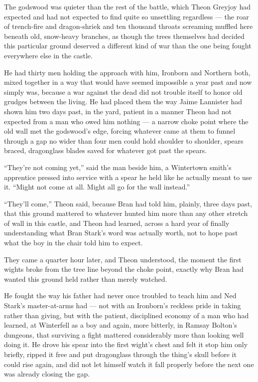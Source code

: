 The godswood was quieter than the rest of the battle, which Theon Greyjoy had expected and had not expected to find quite so unsettling regardless — the roar of trench-fire and dragon-shriek and ten thousand throats screaming muffled here beneath old, snow-heavy branches, as though the trees themselves had decided this particular ground deserved a different kind of war than the one being fought everywhere else in the castle.

He had thirty men holding the approach with him, Ironborn and Northern both, mixed together in a way that would have seemed impossible a year past and now simply was, because a war against the dead did not trouble itself to honor old grudges between the living. He had placed them the way Jaime Lannister had shown him two days past, in the yard, patient in a manner Theon had not expected from a man who owed him nothing — a narrow choke point where the old wall met the godswood’s edge, forcing whatever came at them to funnel through a gap no wider than four men could hold shoulder to shoulder, spears braced, dragonglass blades saved for whatever got past the spears.

“They’re not coming yet,” said the man beside him, a Wintertown smith’s apprentice pressed into service with a spear he held like he actually meant to use it. “Might not come at all. Might all go for the wall instead.”

“They’ll come,” Theon said, because Bran had told him, plainly, three days past, that this ground mattered to whatever hunted him more than any other stretch of wall in this castle, and Theon had learned, across a hard year of finally understanding what Bran Stark’s word was actually worth, not to hope past what the boy in the chair told him to expect.

They came a quarter hour later, and Theon understood, the moment the first wights broke from the tree line beyond the choke point, exactly why Bran had wanted this ground held rather than merely watched.

\sceneBreak

He fought the way his father had never once troubled to teach him and Ned Stark’s master-at-arms had — not with an Ironborn’s reckless pride in taking rather than giving, but with the patient, disciplined economy of a man who had learned, at Winterfell as a boy and again, more bitterly, in Ramsay Bolton’s dungeons, that surviving a fight mattered considerably more than looking well doing it. He drove his spear into the first wight’s chest and felt it stop him only briefly, ripped it free and put dragonglass through the thing’s skull before it could rise again, and did not let himself watch it fall properly before the next one was already closing the gap.


